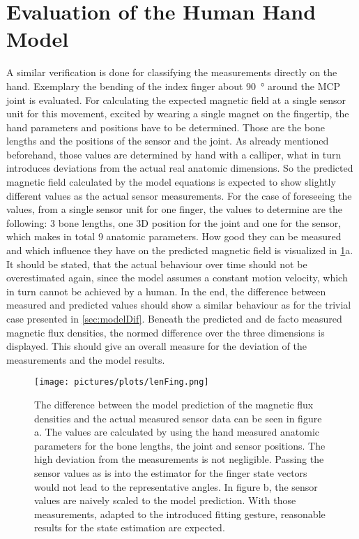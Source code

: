 \FloatBarrier
\section{Evaluation of the Human Hand Model} \label{sec:evalHand}

A similar verification is done for classifying the measurements directly on the hand. Exemplary the bending of the index finger about \SI{90}{\degree} around the \ac{MCP} joint is evaluated. For calculating the expected magnetic field at a single sensor unit for this movement, excited by wearing a single magnet on the fingertip, the hand parameters and positions have to be determined. Those are the bone lengths and the positions of the sensor and the joint. As already mentioned beforehand, those values are determined by hand with a calliper, what in turn introduces deviations from the actual real anatomic dimensions. So the predicted magnetic field calculated by the model equations is expected to show slightly different values as the actual sensor measurements. For the case of foreseeing the values, from a single sensor unit for one finger, the values to determine are the following: 3 bone lengths, one 3D position for the joint and one for the sensor, which makes in total 9 anatomic parameters. How good they can be measured and which influence they have on the predicted magnetic field is visualized in \ref{fig:measHand}a. It should be stated, that the actual behaviour over time should not be overestimated again, since the model assumes a constant motion velocity, which in turn cannot be achieved by a human. In the end, the difference between measured and predicted values should show a similar behaviour as for the trivial case presented in \ref{sec:modelDif}. Beneath the predicted and de facto measured magnetic flux densities, the normed difference over the three dimensions is displayed. This should give an overall measure for the deviation of the measurements and the model results.\\
\begin{figure}[!htb]
\centering
\texttt{[image: pictures/plots/lenFing.png]}
\caption[Influence of erroneous hand dimensions on model predictions]
{The difference between the model prediction of the magnetic flux densities and the actual measured sensor data can be seen in figure a. The values are calculated by using the hand measured anatomic parameters for the bone lengths, the joint and sensor positions. The high deviation from the measurements is not negligible. Passing the sensor values as is into the estimator for the finger state vectors would not lead to the representative angles. In figure b, the sensor values are naively scaled to the model prediction. With those measurements, adapted to the introduced fitting gesture, reasonable results for the state estimation are expected.}
\label{fig:measHand}
\end{figure}
